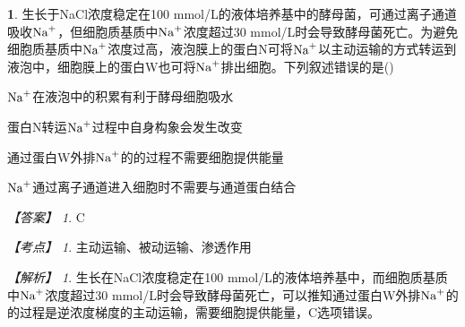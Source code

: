 \documentclass[UTF8, 10pt, a4paper, oneside]{ctexart}
\theoremstyle{definition}
\newtheorem{exercise}{}
\theoremstyle{remark}
\newtheorem*{answer}{【答案】}
\newtheorem*{point}{【考点】}      %
\newtheorem*{explanation}{【解析】}     %
\theoremstyle{plain}
\begin{document}
\begin{exercise}
    生长于NaCl浓度稳定在100 mmol/L的液体培养基中的酵母菌，可通过离子通道吸收$\ce{Na+}$，但细胞质基质中$\ce{Na+}$浓度超过30 mmol/L时会导致酵母菌死亡。为避免细胞质基质中$\ce{Na+}$浓度过高，液泡膜上的蛋白N可将$\ce{Na+}$以主动运输的方式转运到液泡中，细胞膜上的蛋白W也可将$\ce{Na+}$排出细胞。下列叙述错误的是\quad(\quad)
    \begin{adjustwidth}{2em}{}
        \begin{asparaenum}[A. ]
            \item $\ce{Na+}$在液泡中的积累有利于酵母细胞吸水
            \item 蛋白N转运$\ce{Na+}$过程中自身构象会发生改变
            \item 通过蛋白W外排$\ce{Na+}$的的过程不需要细胞提供能量
            \item $\ce{Na+}$通过离子通道进入细胞时不需要与通道蛋白结合
        \end{asparaenum}
    \end{adjustwidth}
    \begin{answer}
        C
    \end{answer}
    \begin{point}
        主动运输、被动运输、渗透作用
    \end{point}
    \begin{explanation}
        生长在NaCl浓度稳定在100 mmol/L的液体培养基中，而细胞质基质中$\ce{Na+}$浓度超过30 mmol/L时会导致酵母菌死亡，可以推知通过蛋白W外排$\ce{Na+}$的的过程是逆浓度梯度的主动运输，需要细胞提供能量，C选项错误。
    \end{explanation}
\end{exercise}
\end{document}
